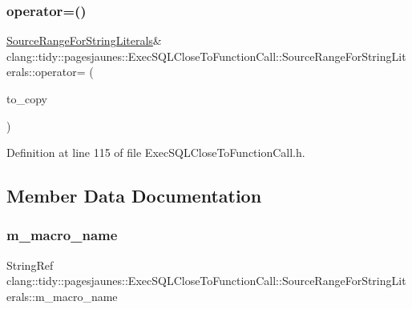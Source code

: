 \subsubsection{\texorpdfstring{operator=()}{operator=()}\hspace{0.1cm}{\footnotesize\ttfamily [2/2]}}
{\footnotesize\ttfamily \hyperlink{classclang_1_1tidy_1_1pagesjaunes_1_1_exec_s_q_l_close_to_function_call_1_1_source_range_for_string_literals}{Source\+Range\+For\+String\+Literals}\& clang\+::tidy\+::pagesjaunes\+::\+Exec\+S\+Q\+L\+Close\+To\+Function\+Call\+::\+Source\+Range\+For\+String\+Literals\+::operator= (\begin{DoxyParamCaption}\item[{\hyperlink{classclang_1_1tidy_1_1pagesjaunes_1_1_exec_s_q_l_close_to_function_call_1_1_source_range_for_string_literals}{Source\+Range\+For\+String\+Literals} \&}]{to\+\_\+copy }\end{DoxyParamCaption})\hspace{0.3cm}{\ttfamily [inline]}}



Definition at line 115 of file Exec\+S\+Q\+L\+Close\+To\+Function\+Call.\+h.



\subsection{Member Data Documentation}
\mbox{\label{classclang_1_1tidy_1_1pagesjaunes_1_1_exec_s_q_l_close_to_function_call_1_1_source_range_for_string_literals_a959b94c0fb33653b1c858a1918b0aa6e}} 
\subsubsection{\texorpdfstring{m\+\_\+macro\+\_\+name}{m\_macro\_name}}
{\footnotesize\ttfamily String\+Ref clang\+::tidy\+::pagesjaunes\+::\+Exec\+S\+Q\+L\+Close\+To\+Function\+Call\+::\+Source\+Range\+For\+String\+Literals\+::m\+\_\+macro\+\_\+name}



